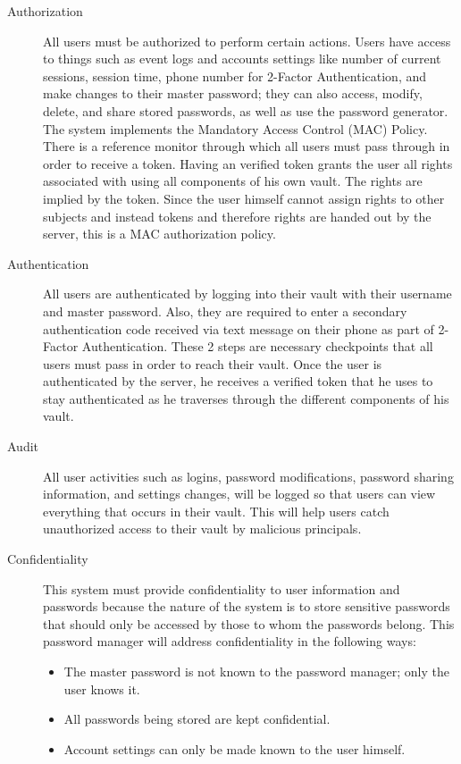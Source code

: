 \documentclass{article}
\begin{document}
\begin{description}
  \item[Authorization] All users must be authorized to perform certain actions. Users have access to things such as event logs and accounts settings like number of current sessions, session time, phone number for 2-Factor Authentication, and make changes to their master password; they can also access, modify, delete, and share stored passwords, as well as use the password generator. The system implements the Mandatory Access Control (MAC) Policy. There is a reference monitor through which all users must pass through in order to receive a token. Having an verified token grants the user all rights associated with using all components of his own vault. The rights are implied by the token. Since the user himself cannot assign rights to other subjects and instead tokens and therefore rights are handed out by the server, this is a MAC authorization policy.
  \item[Authentication] All users are authenticated by logging into their vault with their username and master password. Also, they are required to enter a secondary authentication code received via text message on their phone as part of 2-Factor Authentication. These 2 steps are necessary checkpoints that all users must pass in order to reach their vault. Once the user is authenticated by the server, he receives a verified token that he uses to stay authenticated as he traverses through the different components of his vault.
  \item[Audit] All user activities such as logins, password modifications, password sharing information, and settings changes, will be logged so that users can view everything that occurs in their vault. This will help users catch unauthorized access to their vault by malicious principals.
  \item[Confidentiality] This system must provide confidentiality to user information and passwords because the nature of the system is to store sensitive passwords that should only be accessed by those to whom the passwords belong. This password manager will address confidentiality in the following ways:
\begin{itemize}
  \item The master password is not known to the password manager; only the user knows it.
    \item All passwords being stored are kept confidential.
    \item Account settings can only be made known to the user himself.

\end{itemize}
\end{description}
\end{document}
